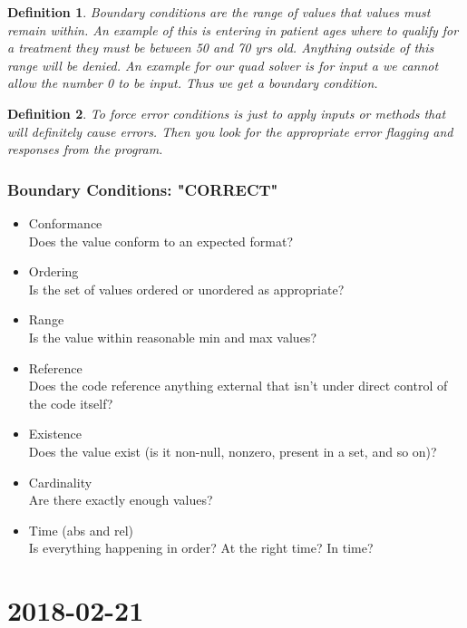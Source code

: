 \documentclass{report}
\newtheorem*{defn}{Definition}
\newcommand{\mychapter}[2]{
	\setcounter{chapter}{#1}
	\setcounter{section}{0}
	\chapter*{#2}
	\addcontentsline{toc}{chapter}{#2}
}
\begin{document}
\begin{defn}
Boundary conditions are the range of values that values must remain within. An example of this is entering in patient ages where to qualify for a treatment they must be between 50 and 70 yrs old. Anything outside of this range will be denied. An example for our quad solver is for input a we cannot allow the number 0 to be input. Thus we get a boundary condition.
\end{defn}

\begin{defn}
To force error conditions is just to apply inputs or methods that will definitely cause errors. Then you look for the appropriate error flagging and responses from the program.
\end{defn}

\subsection{Boundary Conditions: "CORRECT"}
\begin{itemize}
\item Conformance\\  Does the value conform to an expected format?
\item Ordering\\  Is the set of values ordered or unordered as appropriate?
\item Range\\  Is the value within reasonable min and max values?
\item Reference\\  Does the code reference anything external that isn't under direct control of the code itself?
\item Existence\\  Does the value exist (is it non-null, nonzero, present in a set, and so on)?
\item Cardinality\\  Are there exactly enough values?
\item Time (abs and rel)\\  Is everything happening in order? At the right time? In time?
\end{itemize}

\mychapter{2}{2018-02-21}
\end{document}
